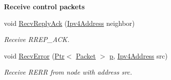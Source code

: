 \begin{Indent}{\bf Receive control packets}
\begin{DoxyCompactItemize}
void \hyperlink{classns3_1_1aodv_1_1RoutingProtocol_a25f07838b23ab376930c4338fa9fbe50}{Recv\+Reply\+Ack} (\hyperlink{classns3_1_1Ipv4Address}{Ipv4\+Address} neighbor)
\begin{DoxyCompactList}\small\item\em Receive R\+R\+E\+P\+\_\+\+A\+CK. \end{DoxyCompactList}\item 
void \hyperlink{classns3_1_1aodv_1_1RoutingProtocol_ae93fba9dbcde4f1eb0f2d7a189e9ae54}{Recv\+Error} (\hyperlink{classns3_1_1Ptr}{Ptr}$<$ \hyperlink{classns3_1_1Packet}{Packet} $>$ \hyperlink{lte__link__budget__x2__handover__measures_8m_ac9de518908a968428863f829398a4e62}{p}, \hyperlink{classns3_1_1Ipv4Address}{Ipv4\+Address} src)
\begin{DoxyCompactList}\small\item\em Receive R\+E\+RR from node with address src. \end{DoxyCompactList}\end{DoxyCompactItemize}
\end{Indent}
